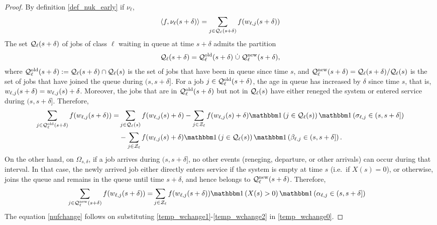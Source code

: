 \documentclass{article}
\theoremstyle{definition}
\numberwithin{equation}{section}
\begin{document}
\begin{proof}
  By definition \eqref{def_nuk_early} if $\nu_\ell$,
  \begin{equation}\label{temp_wchange0}
    \langle f,\nu_\ell(s+\delta)\rangle=\sum_{j\in\mathcal{Q}_\ell(s+\delta)} f(w_{\ell,j}(s+\delta))
  \end{equation}
  The set $\mathcal{Q}_\ell(s+\delta)$ of jobs of class $\ell$ waiting in queue at time $s+\delta$ admits the partition
  \begin{align}\label{temp_wchange1}
	\mathcal{Q}_\ell(s+\delta) = \mathcal{Q}_\ell^{\text{old}}(s+\delta)\; \dot\cup \;\mathcal{Q}_\ell^\text{new}(s+\delta),
  \end{align}
where   $\mathcal{Q}_\ell^{\text{old}}(s+\delta):= \mathcal{Q}_\ell(s+\delta) \cap \mathcal{Q}_\ell(s)$ is the set of jobs that have been in queue since time $s$, and  $\mathcal{Q}_\ell^\text{new}(s+\delta) = \mathcal{Q}_\ell(s+\delta) / \mathcal{Q}_\ell(s)$ is the set of jobs that have joined the queue during $(s,s+\delta]$. For a job $j\in\mathcal{Q}_\ell^{\text{old}}(s+\delta)$, the age in queue has increased by $\delta$ since time $s$, that is, $w_{\ell,j}(s+\delta)=w_{\ell,j}(s)+\delta$. Moreover, the jobs that are in $\mathcal{Q}_\ell^{\text{old}}(s+\delta)$ but not in $\mathcal{Q}_\ell(s)$ have either reneged the system or entered service during $(s,s+\delta]$. Therefore,
\begin{align}
	\sum_{j\in\inque_\ell^{\text{old}}(s+\delta)} f(w_{\ell,j}(s+\delta)) = & 	\sum_{j\in\inque_\ell(s)} f(w_{\ell,j}(s)+\delta) - \sum_{j\in\indexSet_\ell}f(w_{\ell,j}(s)+\delta)\indic{j\in\inque_\ell(s)} \indic{\renegtime_{\ell,j}\in(s,s+\delta]} \notag\\
	      & - \sum_{j\in\indexSet_\ell}f(w_{\ell,j}(s)+\delta)\indic{j\in\inque_\ell(s)}\indic{\entrytime_{\ell,j}\in(s,s+\delta]}.
\end{align}
On the other hand, on $\Omega_{s,\delta}$, if a job arrives during $(s,s+\delta]$, no other events (reneging, departure, or other arrivals) can occur during that interval. In that case, the newly arrived job either directly enters service if the system is empty at time $s$ (i.e.\ if $X(s)=0$), or otherwise, joins the queue and remains in the queue until time $s+\delta$, and hence belongs to $\mathcal{Q}_\ell^\text{new}(s+\delta)$. Therefore,
\begin{align}\label{temp_wchange2}
\sum_{j\in\inque_\ell^\text{new}(s+\delta)} f(w_{\ell,j}(s+\delta)) =  & \sum_{j\in\indexSet_\ell}f(w_{\ell,j}(s+\delta))\indic{X(s)>0}\indic{\arrivaltime_{\ell,j}\in(s,s+\delta]}
\end{align}
The equation \eqref{nufchange} follows on substituting \eqref{temp_wchange1}-\eqref{temp_wchange2} in \eqref{temp_wchange0}.

\end{proof}
\end{document}
